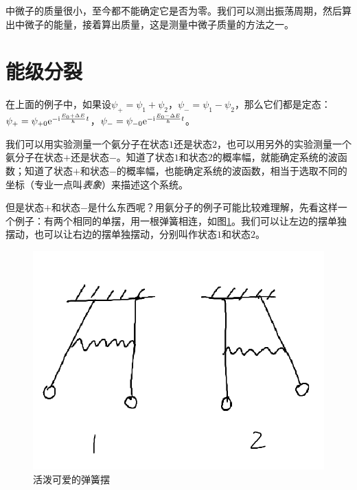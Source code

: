 中微子的质量很小，至今都不能确定它是否为零。我们可以测出振荡周期，然后算出中微子的能量，接着算出质量，这是测量中微子质量的方法之一。
\section{能级分裂}
在上面的例子中，如果设$\psi_+=\psi_1+\psi_2$，$\psi_-=\psi_1-\psi_2$，那么它们都是定态：$\psi_+=\psi_{+ 0} \mathrm{e}^{-\mathrm{i} \frac{E_0+\Delta E}{\hbar} t}$，$\psi_-=\psi_{- 0} \mathrm{e}^{-\mathrm{i} \frac{E_0-\Delta E}{\hbar} t}$。

我们可以用实验测量一个氨分子在状态$1$还是状态$2$，也可以用另外的实验测量一个氨分子在状态$+$还是状态$-$。知道了状态$1$和状态$2$的概率幅，就能确定系统的波函数；知道了状态$+$和状态$-$的概率幅，也能确定系统的波函数，相当于选取不同的坐标（专业一点叫\emph{表象}）来描述这个系统。

但是状态$+$和状态$-$是什么东西呢？用氨分子的例子可能比较难理解，先看这样一个例子：有两个相同的单摆，用一根弹簧相连，如图\ref{fig-spring-pend}。我们可以让左边的摆单独摆动，也可以让右边的摆单独摆动，分别叫作状态$1$和状态$2$。
\begin{figure}[htb]
\centering
\includegraphics[scale=0.5]{fig/spring-pend.png}
\caption{活泼可爱的弹簧摆}
\label{fig-spring-pend}
\end{figure}

